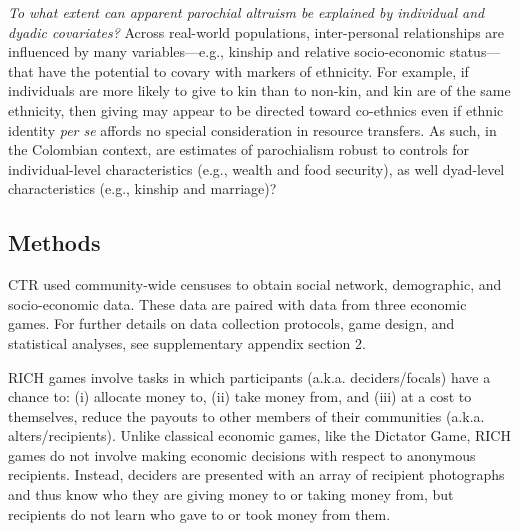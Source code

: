 \documentclass[bibauthoryear]{aa}
\begin{document}
\begin{enumerate*}[label={Q(\arabic*)},font={\color{blue!50!black}\bfseries}]
\item \label{q5} \emph{To what extent can apparent parochial altruism be explained by individual and dyadic covariates?} 
Across real-world populations, inter-personal relationships are influenced by many variables---e.g., kinship and relative socio-economic status---that have the potential to covary with markers of ethnicity. For example, if individuals are more likely to give to kin than to non-kin, and kin are of the same ethnicity, then giving may appear to be directed toward co-ethnics even if ethnic identity \emph{per se} affords no special consideration in resource transfers. As such, in the Colombian context, are estimates of parochialism  robust to controls for individual-level  characteristics (e.g., wealth and food security), as well dyad-level characteristics (e.g., kinship and  marriage)? 

\end{enumerate*}


\subsection{Methods}
CTR used community-wide censuses to obtain social network, demographic, and socio-economic data.  These data are paired with data from three economic games. For further details on data collection protocols, game design, and statistical analyses, see supplementary appendix section 2.

 RICH games \citep{gervais2017rich} involve tasks in which participants (a.k.a. deciders/focals) have a chance to: (i) allocate money to, (ii) take money from, and (iii) at a cost to themselves, reduce the payouts to other members of their communities (a.k.a. alters/recipients). %
 Unlike classical economic games, like the Dictator  Game, RICH games do not involve making economic decisions with respect to anonymous recipients. Instead, deciders are presented with an array of recipient photographs and thus know who they are giving money to or taking money from, but recipients do not learn who gave to or took money from them. 
\end{document}
